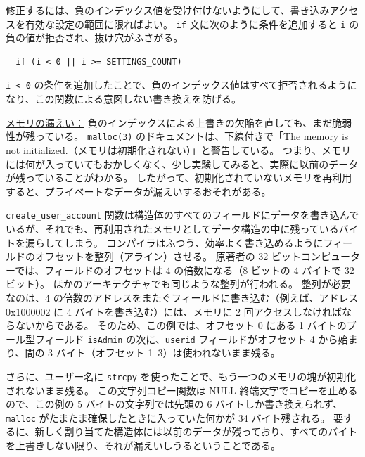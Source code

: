 \documentclass[uplatex]{jsarticle}
\begin{document}
修正するには、負のインデックス値を受け付けないようにして、書き込みアクセスを有効な設定の範囲に限ればよい。
\texttt{if} 文に次のように条件を追加すると \texttt{i} の負の値が拒否され、抜け穴がふさがる。

\begin{verbatim}
  if (i < 0 || i >= SETTINGS_COUNT)
\end{verbatim}

\texttt{i < 0} の条件を追加したことで、負のインデックス値はすべて拒否されるようになり、この関数による意図しない書き換えを防げる。

\underline{メモリの漏えい：}
負のインデックスによる上書きの欠陥を直しても、まだ脆弱性が残っている。
\texttt{malloc(3)} のドキュメントは、下線付きで「The memory is not initialized.（メモリは初期化されない）」と警告している。
つまり、メモリには何が入っていてもおかしくなく、少し実験してみると、実際に以前のデータが残っていることがわかる。
したがって、初期化されていないメモリを再利用すると、プライベートなデータが漏えいするおそれがある。

\texttt{create\_user\_account} 関数は構造体のすべてのフィールドにデータを書き込んでいるが、それでも、再利用されたメモリとしてデータ構造の中に残っているバイトを漏らしてしまう。
コンパイラはふつう、効率よく書き込めるようにフィールドのオフセットを整列（アライン）させる。
原著者の 32 ビットコンピューターでは、フィールドのオフセットは 4 の倍数になる（8 ビットの 4 バイトで 32 ビット）。
ほかのアーキテクチャでも同じような整列が行われる。
整列が必要なのは、4 の倍数のアドレスをまたぐフィールドに書き込む（例えば、アドレス 0x1000002 に 4 バイトを書き込む）には、メモリに 2 回アクセスしなければならないからである。
そのため、この例では、オフセット 0 にある 1 バイトのブール型フィールド \texttt{isAdmin} の次に、\texttt{userid} フィールドがオフセット 4 から始まり、間の 3 バイト（オフセット 1--3）は使われないまま残る。

さらに、ユーザー名に \texttt{strcpy} を使ったことで、もう一つのメモリの塊が初期化されないまま残る。
この文字列コピー関数は NULL 終端文字でコピーを止めるので、この例の 5 バイトの文字列では先頭の 6 バイトしか書き換えられず、\texttt{malloc} がたまたま確保したときに入っていた何かが 34 バイト残される。
要するに、新しく割り当てた構造体には以前のデータが残っており、すべてのバイトを上書きしない限り、それが漏えいしうるということである。
\end{document}
